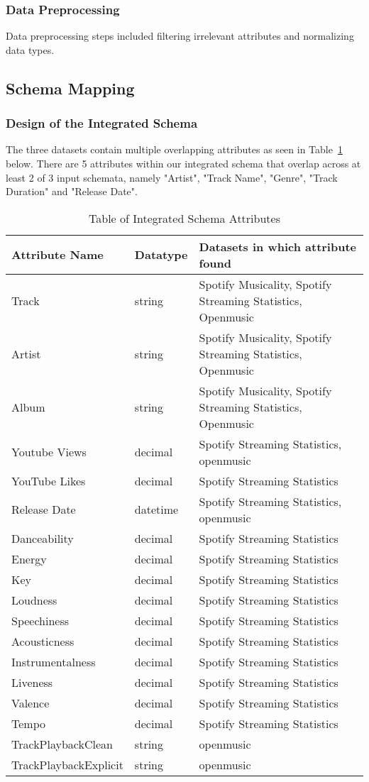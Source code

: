 \documentclass[runningheads]{llncs}
\begin{document}
\subsubsection{Data Preprocessing}
Data preprocessing steps included filtering irrelevant attributes and normalizing data types.

\subsection{Schema Mapping}
\subsubsection{Design of the Integrated Schema}
The three datasets contain multiple overlapping attributes as seen in Table~\ref{tab2} below. There are 5 attributes within our integrated schema that overlap across at least 2 of 3 input schemata, namely "Artist", "Track Name", "Genre", "Track Duration" and "Release Date".

\begin{table}[h]
	\renewcommand{\arraystretch}{1.5}
	\caption{Table of Integrated Schema Attributes}\label{tab2}
	\centering
	\begin{tabular}{p{4cm}p{3cm}p{6cm}}
		\toprule
		\textbf{Attribute Name} &  \textbf{ Datatype}&\textbf{Datasets in which  attribute found}\\
		\hline
		\hline
		Track&string&Spotify  Musicality, Spotify  Streaming  Statistics, Openmusic\\
		Artist&string&Spotify  Musicality, Spotify  Streaming  Statistics, Openmusic\\
		Album&string&Spotify  Musicality, Spotify  Streaming  Statistics, Openmusic\\
		Youtube Views&decimal&Spotify  Streaming  Statistics, openmusic\\
		YouTube Likes&decimal&Spotify  Streaming  Statistics\\
		Release Date&datetime&Spotify  Streaming  Statistics, openmusic\\
		Danceability&decimal&Spotify  Streaming  Statistics\\
		Energy&decimal&Spotify  Streaming  Statistics\\
		Key&decimal&Spotify  Streaming  Statistics\\
		Loudness&decimal&Spotify  Streaming  Statistics\\
		Speechiness&decimal&Spotify  Streaming  Statistics\\
		Acousticness&decimal&Spotify  Streaming  Statistics\\
		Instrumentalness&decimal&Spotify  Streaming  Statistics\\
		Liveness&decimal&Spotify  Streaming  Statistics\\
		Valence&decimal&Spotify  Streaming  Statistics\\
		Tempo&decimal&Spotify  Streaming  Statistics\\
		TrackPlaybackClean&string&openmusic\\
		TrackPlaybackExplicit&string&openmusic\\
		\hline
		\hline
	\end{tabular}
\end{table}
\end{document}
